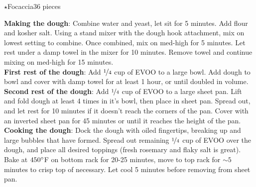 \begin{recipe}{\texorpdfstring{$\star$}{str}Focaccia}{36 pieces}{}



    \textbf{Making the dough}: Combine water and yeast, let sit for 5 minutes. Add flour and kosher salt. Using a stand mixer with the dough hook attachment, mix on lowest setting to combine. Once combined, mix on med-high for 5 minutes. Let rest under a damp towel in the mixer for 10 minutes. Remove towel and continue mixing on med-high for 15 minutes. \\

    \textbf{First rest of the dough}: Add $\nicefrac{1}{4}$ cup of EVOO to a large bowl. Add dough to bowl and cover with damp towel for at least 1 hour, or until doubled in volume. \\

    \textbf{Second rest of the dough}: Add $\nicefrac{1}{4}$ cup of EVOO to a large sheet pan. Lift and fold dough at least 4 times in it's bowl, then place in sheet pan. Spread out, and let rest for 10 minutes if it doesn't reach the corners of the pan. Cover with an inverted sheet pan for 45 minutes or until it reaches the height of the pan. \\

    \textbf{Cooking the dough}: Dock the dough with oiled fingertips, breaking up and large bubbles that have formed. Spread out remaining $\nicefrac{1}{4}$ cup of EVOO over the dough, and place all desired toppings (fresh rosemary and flaky salt is great). Bake at $450\degree$F on bottom rack for 20-25 minutes, move to top rack for $\sim5$ minutes to crisp top of necessary. Let cool 5 minutes before removing from sheet pan.
\end{recipe}